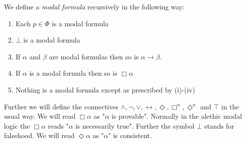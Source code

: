 \documentclass[../main.tex]{subfiles}
\begin{document}
\begin{defi}
	We define a \textit{modal formula} recursively in the following way:
	\begin{enumerate}[label=\roman*.]
		\item Each $p\in\Phi$ is a modal formula
		\item $\bot$ is a modal formula
		\item If $\alpha$ and $\beta$ are modal formulas then so is
			$\alpha\rightarrow\beta$.
		\item If $\alpha$ is a modal formula then so is $\Box\alpha$
		\item Nothing is a modal formula except as prescribed by
			(i)-(iv)
	\end{enumerate}
\end{defi}
Further we will define the connectives $\wedge,\neg,\vee,\leftrightarrow,
\Diamond, \Box^n,\Diamond^n$ and $\top$
in the usual way. 
We will read $\Box\alpha$ as "$\alpha$ is provable". Normally in the alethic modal logic the
$\Box\alpha$ reads "$\alpha$ is necessarily true". Further the symbol $\bot$ stands
for falsehood. We will read $\Diamond \alpha$ as "$\alpha$" is consistent.
\end{document}
